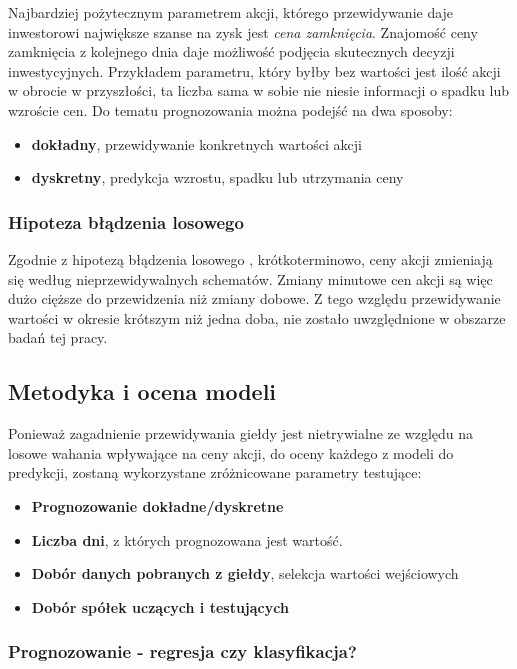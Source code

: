 \documentclass[a4paper, twoside, 11pt, openright]{article}
\begin{document}
Najbardziej pożytecznym parametrem akcji, którego przewidywanie daje inwestorowi największe szanse na zysk jest \textit{cena zamknięcia}. Znajomość ceny zamknięcia z kolejnego dnia daje możliwość podjęcia skutecznych decyzji inwestycyjnych. Przykładem parametru, który byłby bez wartości jest ilość akcji w obrocie w przyszłości, ta liczba sama w sobie nie niesie informacji o spadku lub wzroście cen. Do tematu prognozowania można podejść na dwa sposoby:
\begin{itemize}
\item{\textbf{dokładny}, przewidywanie konkretnych wartości akcji}
\item{\textbf{dyskretny}, predykcja wzrostu, spadku lub utrzymania ceny}
\end{itemize}

\subsubsection{Hipoteza błądzenia losowego}

Zgodnie z hipotezą błądzenia losowego \cite{randwalk}, krótkoterminowo, ceny akcji zmieniają się według nieprzewidywalnych schematów. Zmiany minutowe cen akcji są więc dużo cięższe do przewidzenia niż zmiany dobowe. Z tego względu przewidywanie wartości w okresie krótszym niż jedna doba, nie zostało uwzględnione w obszarze badań tej pracy.

\subsection{Metodyka i ocena modeli}

Ponieważ zagadnienie przewidywania giełdy jest nietrywialne ze względu na losowe wahania wpływające na ceny akcji, do oceny każdego z modeli do predykcji, zostaną wykorzystane zróżnicowane parametry testujące:
	
\begin{itemize}
\item{\textbf{Prognozowanie dokładne/dyskretne} }
\item{\textbf{Liczba dni}, z których prognozowana jest wartość.}
\item{\textbf{Dobór danych pobranych z giełdy}, selekcja wartości wejściowych}
\item{\textbf{Dobór spółek uczących i testujących}}
\end{itemize}

\subsubsection{Prognozowanie - regresja czy klasyfikacja?}
\end{document}
